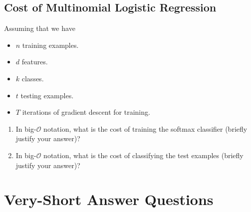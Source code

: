 \documentclass{article}
\def\blu#1{{\color{blu}#1}}
\def\items#1{\begin{itemize}#1\end{itemize}}
\def\enum#1{\begin{enumerate}#1\end{enumerate}}
\begin{document}
\subsection{Cost of Multinomial Logistic Regression}

Assuming that we have
\items{
\item $n$ training examples.
\item $d$ features.
\item $k$ classes.
\item $t$ testing examples.
\item $T$ iterations of gradient descent for training.
}
\blu{\enum{
\item In big-$\mathcal{O}$ notation, what is the cost of training the softmax classifier (briefly justify your answer)?
\item In big-$\mathcal{O}$ notation, what is the cost of classifying the test examples (briefly justify your answer)?
}}

\pagebreak

\section{Very-Short Answer Questions}
\end{document}
